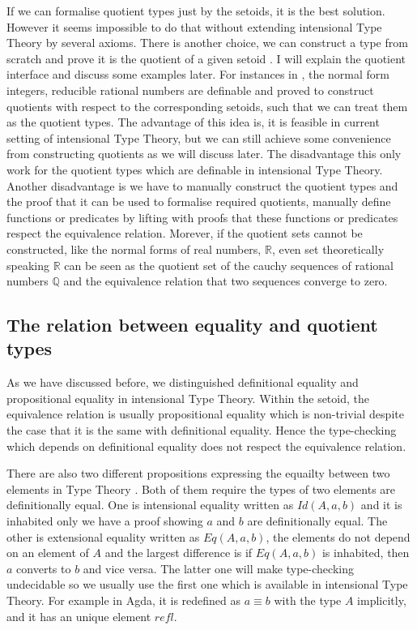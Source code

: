 \documentclass[envcountsame]{llncs}
\newcommand{\Q}{\mathbb{Q}}
\newcommand{\R}{\mathbb{R}}
\newcommand{\itt}{intensional Type Theory}
\begin{document}
If we can formalise quotient types just by the setoids, it is the best solution. However it seems impossible to do that without extending \itt{} by several axioms. There is another choice, we can construct a type from scratch and prove it is the quotient of a given setoid \cite{aan}.
I will explain the quotient interface and discuss some examples later. For instances in \cite{nuo:10}, the normal form integers,  reducible rational numbers are definable and proved to construct quotients with respect to the corresponding setoids,  such that we can treat them as the quotient types.
The advantage of this idea is, it is feasible in current setting of
intensional Type Theory,  but we can still achieve some convenience
from constructing quotients as we will discuss later. The disadvantage
this only work for the quotient types which are definable in
\itt{}. Another disadvantage is we have to manually construct  the
quotient types and the proof that it can be used to formalise required
quotients,  manually define functions or predicates by lifting with
proofs that these functions or predicates respect the equivalence
relation\cite{hof:95:sm}.  Morever, if the quotient sets cannot be
constructed, like the normal forms of real numbers, $\R$, even set
theoretically speaking  $\R$  can be seen as the  quotient set of the
cauchy sequences of rational numbers  $\Q$ and the equivalence
relation that two sequences converge to zero. 


\subsection{The relation between equality and quotient types}
As we have discussed before, we distinguished definitional equality
and propositional equality in \itt{}. Within the setoid, the
equivalence relation is usually propositional equality which is
non-trivial despite the case that it is the same with definitional
equality. Hence the type-checking which depends on definitional
equality does not respect the equivalence relation.

There are also two different propositions expressing the equailty
between two elements in Type Theory \cite{nor:90}. Both of them
require the types of two elements are definitionally equal.
One is intensional equality written as $Id(A,a,b)$ and it is inhabited
only we have a proof showing $a$ and $b$ are definitionally equal. The
other is extensional equality written as $Eq(A,a,b)$, the elements
do not depend on an element of $A$ and the largest difference is if
$Eq(A,a,b)$ is inhabited, then $a$ converts to $b$ and vice versa. The
latter one will make type-checking undecidable so we usually use the
first one which is available in \itt{}. For example in Agda, it is
redefined as $a \equiv b$ with the type $A$ implicitly, and it has an
unique element $refl$.
\end{document}
